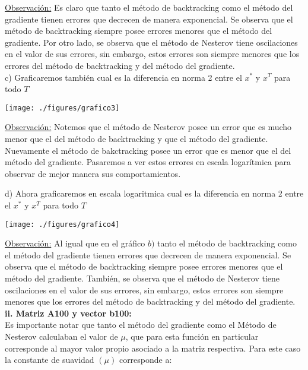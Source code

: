 \documentclass[11pt]{article}
\begin{document}
\underline{Observación:} Es claro que tanto el método de backtracking como el método del gradiente tienen errores que decrecen de manera exponencial. Se observa que el método de backtracking siempre posee errores menores que el método del gradiente. Por otro lado, se observa que el método de Nesterov tiene oscilaciones en el valor de sus errores, sin embargo, estos errores son siempre menores que los errores del método de backtracking y del método del gradiente.   \\


c) Graficaremos también cual es la diferencia en norma 2 entre el $x^{*}$ y $x^T$ para todo $T$ \\

\begin{center}
\texttt{[image: ./figures/grafico3]}
\end{center}

\underline{Observación:} Notemos que el método de Nesterov posee un error que es mucho menor que el del método de backtracking y que el método del gradiente. Nuevamente el método de bakctracking posee un error que es menor que el del método del gradiente. Pasaremos a ver estos errores en escala logarítmica para observar de mejor manera sus comportamientos. \\

\newpage

d) Ahora graficaremos en escala logaritmica cual es la diferencia en norma 2 entre el $x^{*}$ y $x^T$ para todo $T$ \\

\begin{center}
\texttt{[image: ./figures/grafico4]}
\end{center}

\underline{Observación:} Al igual que en el gráfico $b)$ tanto el método de backtracking como el método del gradiente tienen errores que decrecen de manera exponencial. Se observa que el método de backtracking siempre posee errores menores que el método del gradiente. También, se observa que el método de Nesterov tiene oscilaciones en el valor de sus errores, sin embargo, estos errores son siempre menores que los errores del método de backtracking y del método del gradiente. \\

\textbf{ii. Matriz A100 y vector b100:} \\

Es importante notar que tanto el método del gradiente como el Método de Nesterov calculaban el valor de $\mu$, que para esta función en particular corresponde al mayor valor propio asociado a la matriz respectiva. Para este caso la constante de suavidad $(\mu)$ corresponde a:
\end{document}
